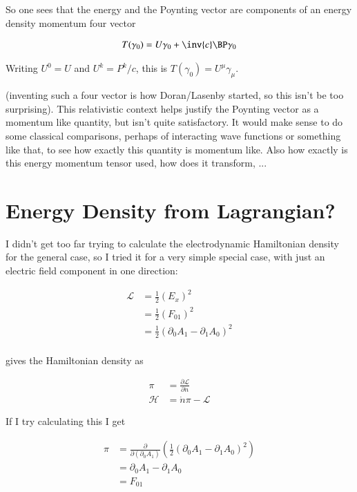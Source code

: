 So one sees that the energy and the Poynting vector are components of an energy density momentum four vector

\begin{align*}
T(\gamma_0) 
&= U \gamma_0 + \inv{c} \BP \gamma_0 \\
\end{align*}

Writing $U^0 = U$ and $U^k = P^k/c$, this is $T(\gamma_0) = U^\mu \gamma_\mu$.

(inventing such a four vector is how Doran/Lasenby started, so this isn't be too surprising).  This
relativistic context helps justify the Poynting vector as a momentum like quantity, but isn't quite
satisfactory.  It would make sense to do some classical comparisons, perhaps of interacting wave functions
or something like that, to see how exactly this quantity is momentum like.  Also how exactly is this energy
momentum tensor used, how does it transform, ...

\section{Energy Density from Lagrangian? }

I didn't get too far trying to calculate the electrodynamic Hamiltonian density for the general case, so I tried it for a very 
simple special case, with just an electric field component in one direction:

\begin{align*}
\mathcal{L}
&= \frac{1}{2}(E_x)^2 \\
&= \frac{1}{2}(F_{01})^2 \\
&= \frac{1}{2}(\partial_0 A_1 - \partial_1 A_0)^2 \\
\end{align*}

\cite{goldstein1951cm} gives the Hamiltonian density as

\begin{align*}
\pi &= \frac{\partial \mathcal{L}}{\partial \dot{n}} \\
\mathcal{H} &= \dot{n} \pi - \mathcal{L}
\end{align*}

If I try calculating this I get

\begin{align*}
\pi 
&= \frac{\partial}{\partial (\partial_0 A_1)} \left( \frac{1}{2}(\partial_0 A_1 - \partial_1 A_0)^2 \right) \\
&= \partial_0 A_1 - \partial_1 A_0 \\
&= F_{01} \\
\end{align*}

